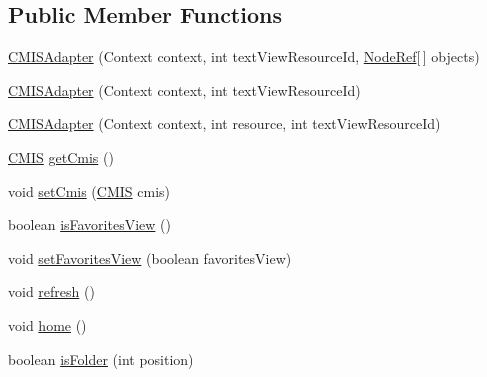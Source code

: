 \subsection*{Public Member Functions}
\begin{DoxyCompactItemize}
\item 
\hyperlink{classcom_1_1zia_1_1freshdocs_1_1widget_1_1adapter_1_1_c_m_i_s_adapter_a25f85c4fae20e355def816cd3dfb3b73}{C\-M\-I\-S\-Adapter} (Context context, int text\-View\-Resource\-Id, \hyperlink{classcom_1_1zia_1_1freshdocs_1_1model_1_1_node_ref}{Node\-Ref}\mbox{[}$\,$\mbox{]} objects)
\item 
\hyperlink{classcom_1_1zia_1_1freshdocs_1_1widget_1_1adapter_1_1_c_m_i_s_adapter_a774811801240d56eb3416d0c1910f9f1}{C\-M\-I\-S\-Adapter} (Context context, int text\-View\-Resource\-Id)
\item 
\hyperlink{classcom_1_1zia_1_1freshdocs_1_1widget_1_1adapter_1_1_c_m_i_s_adapter_ac947401a7853064c01fb35c86e49b124}{C\-M\-I\-S\-Adapter} (Context context, int resource, int text\-View\-Resource\-Id)
\item 
\hyperlink{classcom_1_1zia_1_1freshdocs_1_1cmis_1_1_c_m_i_s}{C\-M\-I\-S} \hyperlink{classcom_1_1zia_1_1freshdocs_1_1widget_1_1adapter_1_1_c_m_i_s_adapter_a705d35dd461b1fa069ef11ac592f5069}{get\-Cmis} ()
\item 
void \hyperlink{classcom_1_1zia_1_1freshdocs_1_1widget_1_1adapter_1_1_c_m_i_s_adapter_ad67d2146bebec839996270b3089ac28e}{set\-Cmis} (\hyperlink{classcom_1_1zia_1_1freshdocs_1_1cmis_1_1_c_m_i_s}{C\-M\-I\-S} cmis)
\item 
boolean \hyperlink{classcom_1_1zia_1_1freshdocs_1_1widget_1_1adapter_1_1_c_m_i_s_adapter_a81a1410c496422e2f7077018af55a175}{is\-Favorites\-View} ()
\item 
void \hyperlink{classcom_1_1zia_1_1freshdocs_1_1widget_1_1adapter_1_1_c_m_i_s_adapter_ad03cff2b10732353e4d62c1a8941b576}{set\-Favorites\-View} (boolean favorites\-View)
\item 
void \hyperlink{classcom_1_1zia_1_1freshdocs_1_1widget_1_1adapter_1_1_c_m_i_s_adapter_adb4bb9fc148444e1bb4a297e6a807430}{refresh} ()
\item 
void \hyperlink{classcom_1_1zia_1_1freshdocs_1_1widget_1_1adapter_1_1_c_m_i_s_adapter_aa5fef1b5eeb92f314781e761e92d282b}{home} ()
\item 
boolean \hyperlink{classcom_1_1zia_1_1freshdocs_1_1widget_1_1adapter_1_1_c_m_i_s_adapter_a4bd676df616d6adee766be783e00f0ab}{is\-Folder} (int position)
\item 

\end{DoxyCompactItemize}
